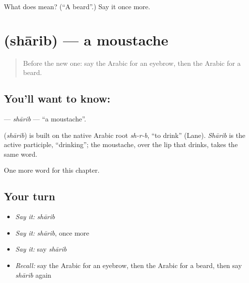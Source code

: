 \begin{tcolorbox}[breakable,colback=teal!4,colframe=teal!35!black,title={Before you move on}]
What does  mean? (\textquotedblleft{}A beard\textquotedblright{}.) Say it once more.
\end{tcolorbox}
\section[\texorpdfstring{\ar{شارب} (shārib)}{شارب (shārib)}]{ (shārib) — a moustache}

\label{lesson:AR-C139-sharib}



\begin{quote}
Before the new one: say the Arabic for an eyebrow, then the Arabic for a beard.
\end{quote}

\subsection*{You'll want to know: }
\textbf{} — \emph{shārib} — \textquotedblleft{}a moustache\textquotedblright{}.

\begin{cousinweb}
\textbf{} (\emph{shārib}) is built on the native Arabic root \emph{sh-r-b}, \textquotedblleft{}to drink\textquotedblright{} (Lane). \emph{Shārib} is the active participle, \textquotedblleft{}drinking\textquotedblright{}; the moustache, over the lip that drinks, takes the same word.
\end{cousinweb}

\begin{grammarlens}[title={What you've built}]
One more word for this chapter.
\end{grammarlens}

\subsection*{Your turn}
\begin{itemize}
\raggedright
  \item \emph{Say it:} \emph{shārib}
  \item \emph{Say it:} \emph{shārib}, once more
  \item \emph{Say it:} say \emph{shārib}
  \item \emph{Recall:} say the Arabic for an eyebrow, then the Arabic for a beard, then say \emph{shārib} again
\end{itemize}

